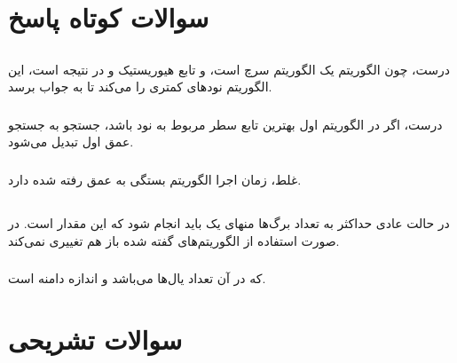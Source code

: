 \documentclass{university}
\begin{document}
\setupdocument

\section{سوالات کوتاه پاسخ}
\subsection{}
\subsubsection{}
درست، چون الگوریتم 
یک الگوریتم سرچ 
است، و تابع هیوریستیک 
و در نتیجه 
است، این الگوریتم نودهای کمتری را 
می‌کند تا به جواب برسد. 

\subsubsection{}
درست، اگر در الگوریتم اول بهترین تابع 
سطر مربوط به نود باشد، جستجو به جستجو عمق اول تبدیل می‌شود.

\subsubsection{}
غلط، زمان اجرا الگوریتم 
بستگی به عمق رفته شده دارد.

\subsection{}
\subsubsection{}
در حالت عادی حداکثر به تعداد برگ‌ها منهای یک باید 
انجام شود که این مقدار 
است. در صورت استفاده از الگوریتم‌های گفته شده باز هم 
تغییری نمی‌کند.

\subsubsection{}
که در آن 
تعداد یال‌ها می‌باشد و 
اندازه دامنه است. 


\section{سوالات تشریحی}
\subsection{}
\end{document}
